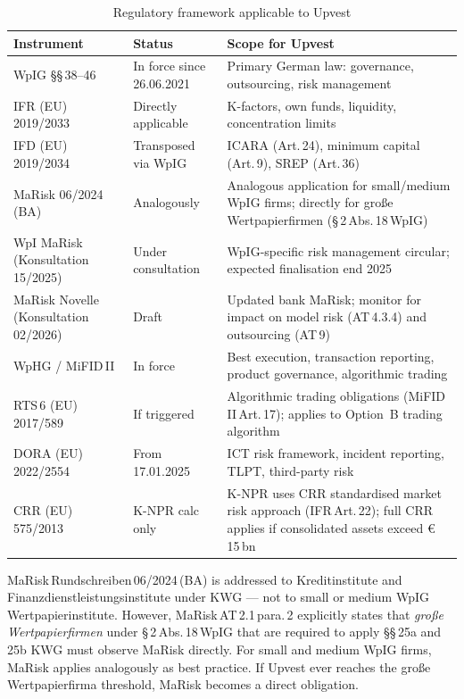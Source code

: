 \documentclass[12pt,a4paper]{report}
\newcommand{\eur}{\euro\,}
\begin{document}
\begin{table}[H]
\caption{Regulatory framework applicable to Upvest}
\label{tab:framework}
\small
\begin{tabularx}{\textwidth}{@{}L{4.5cm}L{2.5cm}X@{}}
\toprule
\textbf{Instrument} & \textbf{Status} & \textbf{Scope for Upvest} \\
\midrule
WpIG \S\S\,38--46 & In force since 26.06.2021 & Primary German law: governance, outsourcing, risk management \\[3pt]
IFR (EU) 2019/2033 & Directly applicable & K-factors, own funds, liquidity, concentration limits \\[3pt]
IFD (EU) 2019/2034 & Transposed via WpIG & ICARA (Art.\,24), minimum capital (Art.\,9), SREP (Art.\,36) \\[3pt]
MaRisk 06/2024 (BA) & Analogously & Analogous application for small/medium WpIG firms; directly for gro{\ss}e Wertpapierfirmen (\S\,2\,Abs.\,18\,WpIG) \\[3pt]
WpI MaRisk (Konsultation 15/2025) & Under consultation & WpIG-specific risk management circular; expected finalisation end 2025 \\[3pt]
MaRisk Novelle (Konsultation 02/2026) & Draft & Updated bank MaRisk; monitor for impact on model risk (AT\,4.3.4) and outsourcing (AT\,9) \\[3pt]
WpHG / MiFID\,II & In force & Best execution, transaction reporting, product governance, algorithmic trading \\[3pt]
RTS\,6 (EU) 2017/589 & If triggered & Algorithmic trading obligations (MiFID\,II\,Art.\,17); applies to Option~B trading algorithm \\[3pt]
DORA (EU) 2022/2554 & From 17.01.2025 & ICT risk framework, incident reporting, TLPT, third-party risk \\[3pt]
CRR (EU) 575/2013 & K-NPR calc only & K-NPR uses CRR standardised market risk approach (IFR\,Art.\,22); full CRR applies if consolidated assets exceed \eur{}15\,bn \\
\bottomrule
\end{tabularx}
\end{table}

\begin{regbox}
MaRisk\,Rundschreiben\,06/2024\,(BA) is addressed to Kreditinstitute and
Finanzdienstleistungsinstitute under KWG --- not to small or medium WpIG
Wertpapierinstitute. However, MaRisk\,AT\,2.1\,para.\,2 explicitly states that
\textit{gro{\ss}e Wertpapierfirmen} under \S\,2\,Abs.\,18\,WpIG that are required to apply
\S\S\,25a and 25b KWG must observe MaRisk directly. For small and medium WpIG firms,
MaRisk applies analogously as best practice. If Upvest ever reaches the
gro{\ss}e Wertpapierfirma threshold, MaRisk becomes a direct obligation.
\end{regbox}
\end{document}
